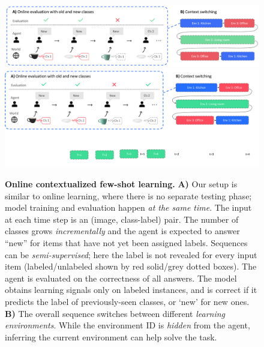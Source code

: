 \begin{figure}[t]
\vspace{-0.5in}
\centering
\iflatexml
\includegraphics[width=6\textwidth]{figures/online_evaluation.png}
\else
\includegraphics[width=\textwidth,trim={0.0cm 7.5cm 1.0cm 0},clip]{figures/online_evaluation.pdf}
\fi
\vspace{-0.3in}
\caption{\textbf{Online contextualized few-shot learning.} \textbf{A)} Our setup is similar to
online learning, where there is no separate testing phase; model training and evaluation happen
\textit{at the same time}. The input at each time step is an (image, class-label) pair. The number
of classes grows \textit{incrementally} and the agent is expected to answer ``new'' for items that
have not yet been assigned labels. Sequences can be \textit{semi-supervised}; here the label is not
revealed for every input item (labeled/unlabeled shown by red solid/grey dotted boxes). The agent is
evaluated on the correctness of all answers. The model obtains learning signals only on labeled
instances, and is correct if it predicts the label of previously-seen classes, or `new' for new
ones. \textbf{B)} The overall sequence switches between different \textit{learning environments}.
While the environment ID is \textit{hidden} from the agent, inferring the current environment can
help solve the task. }
\label{fig:setup}
\vspace{-0.15in}
\end{figure}
